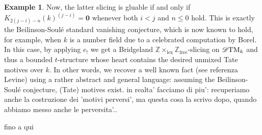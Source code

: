 \documentclass{article}
\theoremstyle{definition}
\newtheorem{exmp}[thm]{Example}
\newcommand{\Z}{\mathbb{Z}}
\begin{document}
\begin{exmp}
   Now, the latter slicing is gluable if and only if  $K_{2(j-i)-n}(k)^{(j-i)} = \mathbf{0}$  whenever both $i < j$ and $n \leq 0$ hold. This is exactly the Beilinson-Soul\'e standard vanishing conjecture, which is now known to hold, for example, when $k$ is a number field due to a celebrated computation by Borel. In this case, by applying $e_!$ we get a Bridgeland $\Z \times_{\mathrm{lex}} \Z_{\mathrm{free}}$-slicing on $\mathscr{D}\textnormal{TM}_k$ and thus a bounded $t$-structure whose heart contains the desired unmixed Tate motives over $k$. In other words, we recover a well known fact (see {\color{red} referenza Levine}) using a rather abstract and general language: assuming the Beilinson-Soul\'e conjecture, (Tate) motives exist.
   {\color{red} in realta' facciamo di piu': recuperiamo anche la costruzione dei 'motivi perversi', ma questa cosa la scrivo dopo, quando abbiamo messo anche le perversita'.}.
\end{exmp} 







{\Huge fino a qui }
\end{document}
